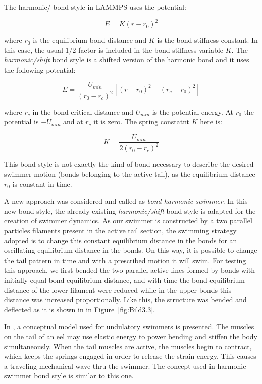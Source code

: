 The harmonic/ bond style in LAMMPS uses the potential:

\begin{equation} 
  E = K ( r - r_{0})^2
\end{equation}

where $r_{0}$ is the equilibrium bond distance and $K$ is the bond stiffness constant. In this case, the usual $1/2$ factor is included in the bond stiffness variable $K$. 
The \textit{harmonic/shift} bond style is a shifted version of the harmonic bond and it uses the following potential:

\begin{equation} 
  E = \frac{U_{min}}{( r_{0} - r_{c})^2} [( r - r_{0})^2 -( r_{c} - r_{0})^2]
\end{equation}

where $r_{c}$ in the bond critical distance and $U_{min}$ is the potential energy. At $r_{0}$ the potential is $-U_{min}$ and at $r_{c}$ it is zero. The spring constatnt $K$
here is:

\begin{equation} 
  K = \frac{U_{min}}{2( r_{0} - r_{c})^2} 
\end{equation}

This bond
style is not exactly the kind of bond necessary to describe the desired swimmer motion (bonds belonging to the active tail), as the equilibrium distance $r_{0}$ is constant in 
time.\par

A new approach was considered and called as \textit{bond harmonic swimmer}. In this new bond style, the already existing \textit{harmonic/shift} bond style is adapted for the creation of
swimmer dynamics. As our swimmer is constructed by a two parallel particles filaments present in the active tail section, the swimming strategy adopted is to change this constant
equilibrium distance in the bonds for an oscillating equilibrium distance in the bonds. On this way, it is possible to change the tail pattern in time and with a prescribed  motion
it will swim. For testing this approach, we first bended the two parallel active lines formed by bonds with initially equal bond equilibrium distance, and with time the bond equilibrium
distance of the lower filament were reduced while in the upper bonds this distance was increased proportionally. Like this, the structure was bended and deflected as it is shown in 
in Figure~\ref{fig:Bild3.3}.\par
In \cite{long_muscles_1998}, a conceptual model used for undulatory swimmers is presented. The muscles on the tail of an eel may use elastic energy to power bending and stiffen the 
body simultaneously. When the tail muscles are active, the muscles begin to contract, which keeps the springs engaged in order to release the strain energy. This causes a traveling
mechanical wave thru the swimmer. The concept used in harmonic swimmer bond style is similar to this one.


